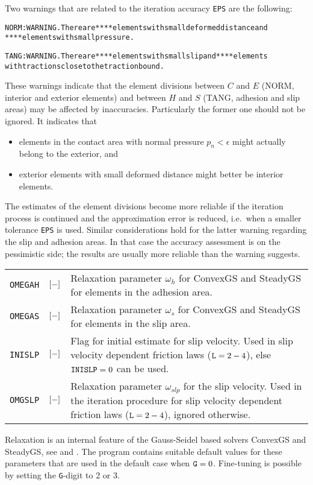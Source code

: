 \documentclass[12pt]{report}
\newenvironment{inputvars}{\vspace{0.4\baselineskip}%

\begin{tabular}{>{\raggedright}p{22mm}p{19mm}p{113mm}}}{
\end{tabular}

}
\newcommand{\inpvar}[3]{{\small\tt #1} & $#2$ & #3 \\[1ex]}
\begin{document}
Two warnings that are related to the iteration accuracy {\tt EPS} are the
following:
\begin{alltt}\small
NORM: WARNING. There are **** elements with small deformed distance and
               **** elements with small pressure.

TANG: WARNING. There are **** elements with small slip and **** elements
               with tractions close to the traction bound.
\end{alltt}
These warnings indicate that the element divisions between $C$ and $E$
(NORM, interior and exterior elements) and between $H$ and $S$ (TANG,
adhesion and slip areas) may be affected by inaccuracies. Particularly the
former one should not be ignored. It indicates that
\begin{itemize}
\item elements in the contact area with normal pressure $p_n < \epsilon$
        might actually belong to the exterior, and
\item exterior elements with small deformed distance might better be
        interior elements.
\end{itemize}
The estimates of the element divisions become more reliable if the iteration
process is continued and the approximation error is reduced, i.e.\ when a
smaller tolerance {\tt EPS} is used. Similar considerations hold for the
latter warning regarding the slip and adhesion areas. In that case the
accuracy assessment is on the pessimistic side; the results are usually more
reliable than the warning suggests.

\begin{inputvars}
\inpvar{OMEGAH}{\bunit{-}}{Relaxation parameter $\omega_h$ for ConvexGS and
        SteadyGS for elements in the adhesion area.}
\inpvar{OMEGAS}{\bunit{-}}{Relaxation parameter $\omega_s$ for ConvexGS and
        SteadyGS for elements in the slip area.}
\inpvar{INISLP}{\bunit{-}}{Flag for initial estimate for slip velocity. Used in
        slip velocity dependent friction laws (${\tt L}=2-4$), else ${\tt
        INISLP}=0$ can be used.}
\inpvar{OMGSLP}{\bunit{-}}{Relaxation parameter $\omega_{slp}$ for the slip
        velocity. Used in the iteration procedure for slip velocity
        dependent friction laws (${\tt L}=2-4$), ignored otherwise.}
\end{inputvars}
Relaxation is an internal feature of the Gauss-Seidel based solvers
ConvexGS and SteadyGS, see \cite{Vollebregt1995a-convexgs} and
\cite{Vollebregt2009a-cm2009}. The program contains suitable default values
for these parameters that are used in the default case when ${\tt G}=0$.
Fine-tuning is possible by setting the {\tt G}-digit to 2 or 3.
\end{document}
